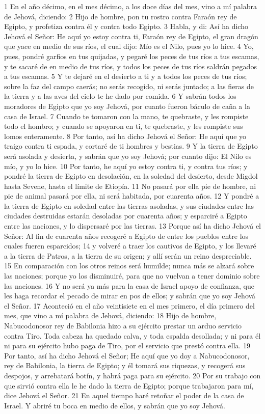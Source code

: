 1 En el año décimo, en el mes décimo, a los doce días del mes, vino a mí palabra de Jehová, diciendo:
2 Hijo de hombre, pon tu rostro contra Faraón rey de Egipto, y profetiza contra él y contra todo Egipto.
3 Habla, y di: Así ha dicho Jehová el Señor: He aquí yo estoy contra ti, Faraón rey de Egipto, el gran dragón que yace en medio de sus ríos, el cual dijo: Mío es el Nilo, pues yo lo hice.
4 Yo, pues, pondré garfios en tus quijadas, y pegaré los peces de tus ríos a tus escamas, y te sacaré de en medio de tus ríos, y todos los peces de tus ríos saldrán pegados a tus escamas.
5 Y te dejaré en el desierto a ti y a todos los peces de tus ríos; sobre la faz del campo caerás; no serás recogido, ni serás juntado; a las fieras de la tierra y a las aves del cielo te he dado por comida.
6 Y sabrán todos los moradores de Egipto que yo soy Jehová, por cuanto fueron báculo de caña a la casa de Israel.
7 Cuando te tomaron con la mano, te quebraste, y les rompiste todo el hombro; y cuando se apoyaron en ti, te quebraste, y les rompiste sus lomos enteramente.
8 Por tanto, así ha dicho Jehová el Señor: He aquí que yo traigo contra ti espada, y cortaré de ti hombres y bestias.
9 Y la tierra de Egipto será asolada y desierta, y sabrán que yo soy Jehová; por cuanto dijo: El Nilo es mío, y yo lo hice. 
10 Por tanto, he aquí yo estoy contra ti, y contra tus ríos; y pondré la tierra de Egipto en desolación, en la soledad del desierto, desde Migdol hasta Sevene, hasta el límite de Etiopía.
11 No pasará por ella pie de hombre, ni pie de animal pasará por ella, ni será habitada, por cuarenta años.
12 Y pondré a la tierra de Egipto en soledad entre las tierras asoladas, y sus ciudades entre las ciudades destruidas estarán desoladas por cuarenta años; y esparciré a Egipto entre las naciones, y lo dispersaré por las tierras.
13 Porque así ha dicho Jehová el Señor: Al fin de cuarenta años recogeré a Egipto de entre los pueblos entre los cuales fueren esparcidos;
14 y volveré a traer los cautivos de Egipto, y los llevaré a la tierra de Patros, a la tierra de su origen; y allí serán un reino despreciable.
15 En comparación con los otros reinos será humilde; nunca más se alzará sobre las naciones; porque yo los disminuiré, para que no vuelvan a tener dominio sobre las naciones.
16 Y no será ya más para la casa de Israel apoyo de confianza, que les haga recordar el pecado de mirar en pos de ellos; y sabrán que yo soy Jehová el Señor.
17 Aconteció en el año veintisiete en el mes primero, el día primero del mes, que vino a mí palabra de Jehová, diciendo:
18 Hijo de hombre, Nabucodonosor rey de Babilonia hizo a su ejército prestar un arduo servicio contra Tiro. Toda cabeza ha quedado calva, y toda espalda desollada; y ni para él ni para su ejército hubo paga de Tiro, por el servicio que prestó contra ella.
19 Por tanto, así ha dicho Jehová el Señor; He aquí que yo doy a Nabucodonosor, rey de Babilonia, la tierra de Egipto; y él tomará sus riquezas, y recogerá sus despojos, y arrebatará botín, y habrá paga para su ejército.
20 Por su trabajo con que sirvió contra ella le he dado la tierra de Egipto; porque trabajaron para mí, dice Jehová el Señor.
21 En aquel tiempo haré retoñar el poder de la casa de Israel. Y abriré tu boca en medio de ellos, y sabrán que yo soy Jehová.

